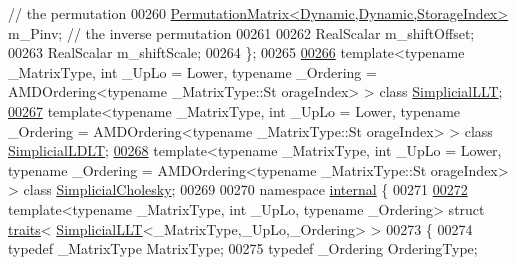 \begin{DoxyCode}
       \textcolor{comment}{// the permutation}
00260     \hyperlink{group___core___module}{PermutationMatrix<Dynamic,Dynamic,StorageIndex>} m\_Pinv; 
       \textcolor{comment}{// the inverse permutation}
00261 
00262     RealScalar m\_shiftOffset;
00263     RealScalar m\_shiftScale;
00264 \};
00265 
\hyperlink{group___sparse_cholesky___module}{00266} \textcolor{keyword}{template}<\textcolor{keyword}{typename} \_MatrixType, \textcolor{keywordtype}{int} \_UpLo = Lower, \textcolor{keyword}{typename} \_Ordering = AMDOrdering<\textcolor{keyword}{typename} \_MatrixType::St
      orageIndex> > \textcolor{keyword}{class }\hyperlink{group___sparse_cholesky___module_class_eigen_1_1_simplicial_l_l_t}{SimplicialLLT};
\hyperlink{group___sparse_cholesky___module}{00267} \textcolor{keyword}{template}<\textcolor{keyword}{typename} \_MatrixType, \textcolor{keywordtype}{int} \_UpLo = Lower, \textcolor{keyword}{typename} \_Ordering = AMDOrdering<\textcolor{keyword}{typename} \_MatrixType::St
      orageIndex> > \textcolor{keyword}{class }\hyperlink{group___sparse_cholesky___module_class_eigen_1_1_simplicial_l_d_l_t}{SimplicialLDLT};
\hyperlink{group___sparse_cholesky___module}{00268} \textcolor{keyword}{template}<\textcolor{keyword}{typename} \_MatrixType, \textcolor{keywordtype}{int} \_UpLo = Lower, \textcolor{keyword}{typename} \_Ordering = AMDOrdering<\textcolor{keyword}{typename} \_MatrixType::St
      orageIndex> > \textcolor{keyword}{class }\hyperlink{group___sparse_cholesky___module_class_eigen_1_1_simplicial_cholesky}{SimplicialCholesky};
00269 
00270 \textcolor{keyword}{namespace }\hyperlink{namespaceinternal}{internal} \{
00271 
\hyperlink{struct_eigen_1_1internal_1_1traits_3_01_simplicial_l_l_t_3_01___matrix_type_00_01___up_lo_00_01___ordering_01_4_01_4}{00272} \textcolor{keyword}{template}<\textcolor{keyword}{typename} \_MatrixType, \textcolor{keywordtype}{int} \_UpLo, \textcolor{keyword}{typename} \_Ordering> \textcolor{keyword}{struct }\hyperlink{struct_eigen_1_1internal_1_1traits}{traits}<
      \hyperlink{group___sparse_cholesky___module_class_eigen_1_1_simplicial_l_l_t}{SimplicialLLT}<\_MatrixType,\_UpLo,\_Ordering> >
00273 \{
00274   \textcolor{keyword}{typedef} \_MatrixType MatrixType;
00275   \textcolor{keyword}{typedef} \_Ordering OrderingType;

\end{DoxyCode}
